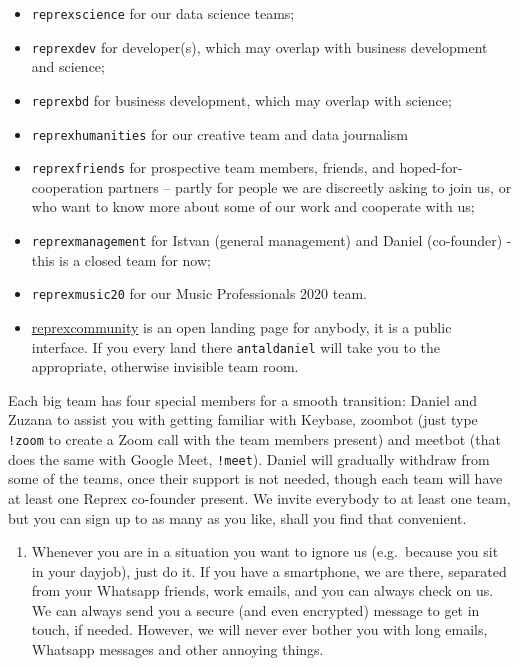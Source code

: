 \documentclass[
  fontsize=13pt,
  english,
  a4paper,
  openany, a4paper, oneside]{article}
\providecommand{\tightlist}{%
  \setlength{\itemsep}{0pt}\setlength{\parskip}{0pt}}
\begin{document}
\begin{itemize}
\tightlist
\item
  \texttt{reprexscience} for our data science teams;
\item
  \texttt{reprexdev} for developer(s), which may overlap with business development and science;
\item
  \texttt{reprexbd} for business development, which may overlap with science;
\item
  \texttt{reprexhumanities} for our creative team and data journalism
\item
  \texttt{reprexfriends} for prospective team members, friends, and hoped-for-cooperation partners -- partly for people we are discreetly asking to join us, or who want to know more about some of our work and cooperate with us;
\item
  \texttt{reprexmanagement} for Istvan (general management) and Daniel (co-founder) - this is a closed team for now;
\item
  \texttt{reprexmusic20} for our Music Professionals 2020 team.
\item
  \href{https://keybase.io/team/reprexcommunity}{reprexcommunity} is an open landing page for anybody, it is a public interface. If you every land there \texttt{antaldaniel} will take you to the appropriate, otherwise invisible team room.
\end{itemize}

Each big team has four special members for a smooth transition: Daniel and Zuzana to assist you with getting familiar with Keybase, zoombot (just type \texttt{!zoom} to create a Zoom call with the team members present) and meetbot (that does the same with Google Meet, \texttt{!meet}). Daniel will gradually withdraw from some of the teams, once their support is not needed, though each team will have at least one Reprex co-founder present. We invite everybody to at least one team, but you can sign up to as many as you like, shall you find that convenient.

\begin{enumerate}
\def\labelenumi{\arabic{enumi}.}
\setcounter{enumi}{8}
\tightlist
\item
  Whenever you are in a situation you want to ignore us (e.g.~because you sit in your dayjob), just do it. If you have a smartphone, we are there, separated from your Whatsapp friends, work emails, and you can always check on us. We can always send you a secure (and even encrypted) message to get in touch, if needed. However, we will never ever bother you with long emails, Whatsapp messages and other annoying things.
\end{enumerate}
\end{document}
